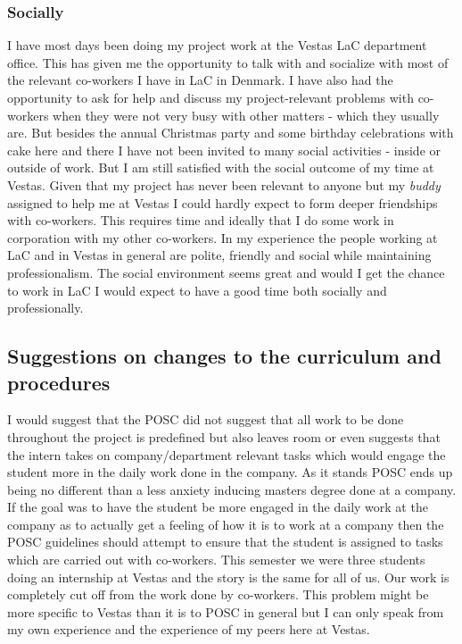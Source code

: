 \subsubsection{Socially}
I have most days been doing my project work at the Vestas LaC department office. This has given me the opportunity to talk with and socialize with most of the relevant co-workers I have in LaC in Denmark. I have also had the opportunity to ask for help and discuss my project-relevant problems with co-workers when they were not very busy with other matters - which they usually are. But besides the annual Christmas party and some birthday celebrations with cake here and there I have not been invited to many social activities - inside or outside of work. But I am still satisfied with the social outcome of my time at Vestas. Given that my project has never been relevant to anyone but my \textit{buddy} assigned to help me at Vestas I could hardly expect to form deeper friendships with co-workers. This requires time and ideally that I do some work in corporation with my other co-workers. In my experience the people working at LaC and in Vestas in general are polite, friendly and social while maintaining professionalism. The social environment seems great and would I get the chance to work in LaC I would expect to have a good time both socially and professionally.

\subsection{Suggestions on changes to the curriculum and procedures}
I would suggest that the POSC did not suggest that all work to be done throughout the project is predefined but also leaves room or even suggests that the intern takes on company/department relevant tasks which would engage the student more in the daily work done in the company. As it stands POSC ends up being no different than a less anxiety inducing masters degree done at a company. If the goal was to have the student be more engaged in the daily work at the company as to actually get a feeling of how it is to work at a company then the POSC guidelines should attempt to ensure that the student is assigned to tasks which are carried out with co-workers. This semester we were three students doing an internship at Vestas and the story is the same for all of us. Our work is completely cut off from the work done by co-workers. This problem might be more specific to Vestas than it is to POSC in general but I can only speak from my own experience and the experience of my peers here at Vestas.


